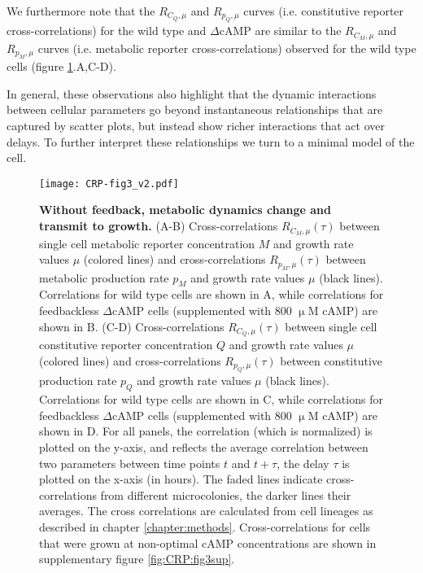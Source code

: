 We furthermore note that the $R_{C_Q,\mu}$ and $R_{p_Q,\mu}$ curves (i.e. constitutive reporter cross-correlations) for the wild type and $\Delta$cAMP are similar to the 
$R_{C_M,\mu}$ and $R_{p_M,\mu}$ curves (i.e. metabolic reporter cross-correlations) observed for the wild type cells 
(figure \ref{fig:CRP:fig3}.A,C-D).
%


In general, these observations also highlight that the dynamic interactions between cellular parameters go beyond instantaneous relationships that are captured by scatter plots, but instead show richer interactions that act over delays. 
To further interpret these relationships we turn to a minimal model of the cell.


\begin{figure}
	\centering
	\texttt{[image: CRP-fig3\_v2.pdf]}
	\caption{ 
		\textbf{Without feedback, metabolic dynamics change and transmit to growth.}
		(A-B) Cross-correlations $R_{C_M,\mu}(\tau)$ between single cell metabolic reporter concentration $M$ and growth rate values $\mu$ (colored lines) and 
		cross-correlations $R_{p_M,\mu}(\tau)$ between metabolic production rate $p_M$ and growth rate values $\mu$ (black lines). 
		Correlations for wild type cells are shown in A, while correlations for feedbackless $\Delta$cAMP cells (supplemented with 800 $\upmu$M cAMP) are shown in B.
		(C-D) Cross-correlations $R_{C_Q,\mu}(\tau)$ between single cell constitutive reporter concentration $Q$ and growth rate values $\mu$ (colored lines) and 
		cross-correlations $R_{p_Q,\mu}(\tau)$ between constitutive production rate $p_Q$ and growth rate values $\mu$ (black lines). 
		Correlations for wild type cells are shown in C, while correlations for feedbackless $\Delta$cAMP cells (supplemented with 800 $\upmu$M cAMP) are shown in D.
		For all panels, the correlation (which is normalized) is plotted on the y-axis, and reflects the average correlation between two parameters between time points $t$ and $t+\tau$, 
		the delay $\tau$ is plotted on the x-axis (in hours). The faded lines indicate cross-correlations from different microcolonies, the darker lines their averages. The cross correlations are calculated from cell lineages as described in chapter \ref{chapter:methods}.
		Cross-correlations for cells that were grown at non-optimal cAMP concentrations are shown in supplementary figure \ref{fig:CRP:fig3sup}.
	}
	\label{fig:CRP:fig3}
\end{figure}



